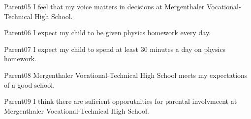 \begin{question}{Parent05}
    \QuestionIndicative
    I feel that my voice matters in decisions at Mergenthaler Vocational-Technical High School.
    \begin{choiceshoriz}[o]
    \end{choiceshoriz}
\end{question}

\begin{question}{Parent06}
    \QuestionIndicative
    I expect my child to be given physics homework every day.
    \begin{choiceshoriz}[o]
    \end{choiceshoriz}
\end{question}

\begin{question}{Parent07}
    \QuestionIndicative
    I expect my child to spend at least 30 minutes a day on physics homework.
    \begin{choiceshoriz}[o]
    \end{choiceshoriz}
\end{question}

\begin{question}{Parent08}
    \QuestionIndicative
    Mergenthaler Vocational-Technical High School meets my expectations of
        a good school.
    \begin{choiceshoriz}[o]
    \end{choiceshoriz}
\end{question}

\begin{question}{Parent09}
    \QuestionIndicative
    I think there are suficient opporutnities for parental involvmeent at
        Mergenthaler Vocational-Technical High School.
    \begin{choiceshoriz}[o]
    \end{choiceshoriz}
\end{question}

